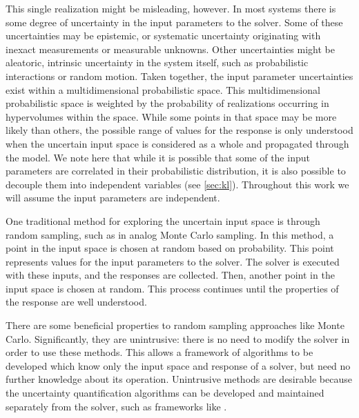 This single realization might be misleading, however.  In most systems there is some degree of uncertainty in
the input parameters to the solver.  Some of these uncertainties may be epistemic, or systematic uncertainty
originating with inexact measurements or measurable unknowns.  Other uncertainties might be aleatoric,
intrinsic uncertainty in the system itself, such as probabilistic interactions or random motion.  Taken
together, the input parameter uncertainties exist within a multidimensional probabilistic space.  This
multidimensional probabilistic space is weighted by the probability of realizations occurring in hypervolumes
within the space.  While some
points in that space may be more likely than others, the possible range of values for the response is only
understood when the uncertain input space is considered as a whole and propagated through the model.  We note 
here that while it is possible
that some of the input parameters are correlated in their probabilistic distribution, it is also possible to
decouple them into independent variables (see \ref{sec:kl}).  Throughout this work we will assume the input parameters 
are independent.

One traditional method for exploring the uncertain input space is through random sampling, such as in analog Monte
Carlo sampling.  In this method, a point in the input space is chosen at random based on probability.  This
point represents values for the input parameters to the solver.  The solver is executed with these inputs, and
the responses are collected.  Then, another point in the input space is chosen at random.  This process continues
until the properties of the response are well understood.

There are some beneficial properties to random sampling approaches like Monte Carlo.  
Significantly, they are unintrusive:
 there is no need to modify the solver in order to use these methods.  This allows a framework of
algorithms to be developed which know only the input space and response of a solver, but need no further knowledge
about its operation.  Unintrusive methods are desirable because the uncertainty quantification algorithms can
be developed and maintained separately from the solver, such as frameworks like \raven{} \cite{raven}.

